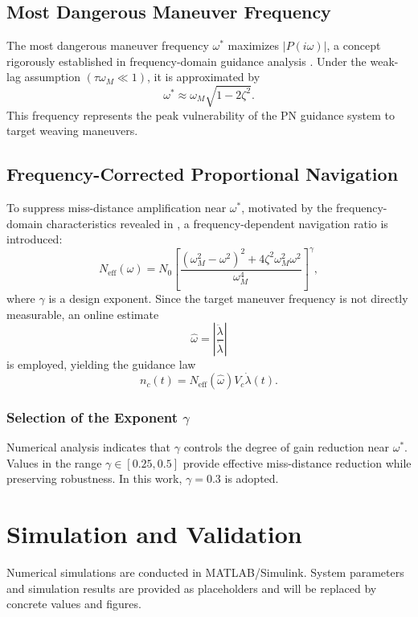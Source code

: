 \documentclass[11pt,a4paper]{article}
\begin{document}
\subsection{Most Dangerous Maneuver Frequency}
The most dangerous maneuver frequency $\omega^*$ maximizes $|P(i\omega)|$, a concept rigorously established in frequency-domain guidance analysis \cite{Yanushevsky2004}. Under the weak-lag assumption $(\tau\omega_M\ll1)$, it is approximated by \cite{Yanushevsky2004}
\begin{equation}
\omega^* \approx \omega_M\sqrt{1-2\zeta^2}.
\end{equation}
This frequency represents the peak vulnerability of the PN guidance system to target weaving maneuvers.

\subsection{Frequency-Corrected Proportional Navigation}
\label{sec:fcpn}
To suppress miss-distance amplification near $\omega^*$, motivated by the frequency-domain characteristics revealed in \cite{Yanushevsky2004,Zarchan1995}, a frequency-dependent navigation ratio is introduced:
\begin{equation}
N_{\mathrm{eff}}(\omega)=N_0\left[\frac{(\omega_M^2-\omega^2)^2+4\zeta^2\omega_M^2\omega^2}{\omega_M^4}\right]^{\gamma},
\end{equation}
where $\gamma$ is a design exponent. Since the target maneuver frequency is not directly measurable, an online estimate
\begin{equation}
\hat\omega=\left|\frac{\ddot\lambda}{\dot\lambda}\right|
\end{equation}
is employed, yielding the guidance law
\begin{equation}
n_c(t)=N_{\mathrm{eff}}(\hat\omega)V_c\dot\lambda(t).
\end{equation}

\subsubsection{Selection of the Exponent $\gamma$}
Numerical analysis indicates that $\gamma$ controls the degree of gain reduction near $\omega^*$. Values in the range $\gamma\in[0.25,0.5]$ provide effective miss-distance reduction while preserving robustness. In this work, $\gamma=0.3$ is adopted.

\section{Simulation and Validation}
Numerical simulations are conducted in MATLAB/Simulink. System parameters and simulation results are provided as placeholders and will be replaced by concrete values and figures.
\end{document}
